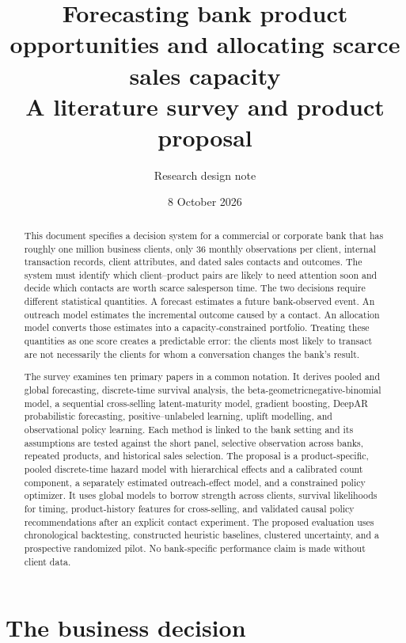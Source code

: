 \documentclass[11pt,oneside]{article}
\title{Forecasting bank product opportunities and allocating scarce sales capacity\\\large A literature survey and product proposal}
\author{Research design note}
\date{8 October 2026}
\begin{document}
\maketitle
\begin{abstract}
This document specifies a decision system for a commercial or corporate bank that has roughly one million business clients, only 36 monthly observations per client, internal transaction records, client attributes, and dated sales contacts and outcomes. The system must identify which client--product pairs are likely to need attention soon and decide which contacts are worth scarce salesperson time. The two decisions require different statistical quantities. A forecast estimates a future bank-observed event. An outreach model estimates the incremental outcome caused by a contact. An allocation model converts those estimates into a capacity-constrained portfolio. Treating these quantities as one score creates a predictable error: the clients most likely to transact are not necessarily the clients for whom a conversation changes the bank's result.

The survey examines ten primary papers in a common notation. It derives pooled and global forecasting, discrete-time survival analysis, the beta-geometric\/negative-binomial model, a sequential cross-selling latent-maturity model, gradient boosting, DeepAR probabilistic forecasting, positive--unlabeled learning, uplift modelling, and observational policy learning. Each method is linked to the bank setting and its assumptions are tested against the short panel, selective observation across banks, repeated products, and historical sales selection. The proposal is a product-specific, pooled discrete-time hazard model with hierarchical effects and a calibrated count component, a separately estimated outreach-effect model, and a constrained policy optimizer. It uses global models to borrow strength across clients, survival likelihoods for timing, product-history features for cross-selling, and validated causal policy recommendations after an explicit contact experiment. The proposed evaluation uses chronological backtesting, constructed heuristic baselines, clustered uncertainty, and a prospective randomized pilot. No bank-specific performance claim is made without client data.
\end{abstract}

\clearpage
\begingroup
\footnotesize
\setcounter{tocdepth}{2}
\tableofcontents
\endgroup
\clearpage

\section{The business decision}

\end{document}

